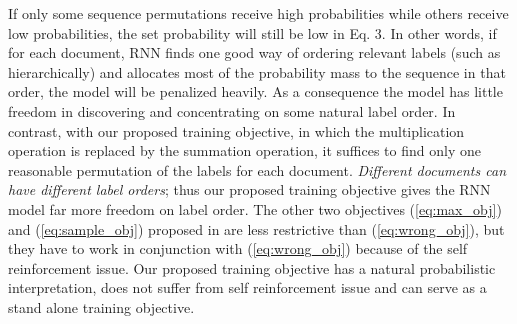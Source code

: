 If only some sequence permutations receive high probabilities while others receive low probabilities, the set probability will still be low in Eq. 3. In other words, if for each document, RNN finds one  good way of ordering relevant labels (such as hierarchically) and allocates most of the probability mass to the sequence in that order, the model will be penalized heavily.  As a consequence the model has little freedom in discovering and concentrating on some natural label order. In contrast, with our proposed training objective, in which the multiplication operation is replaced by the  summation operation, it suffices to find only one reasonable permutation of the labels for each document. \emph{Different documents can have different label orders}; thus our proposed training objective gives the RNN model far more freedom on label order. The other two objectives (\ref{eq:max_obj}) and (\ref{eq:sample_obj}) proposed in \cite{vinyals2015order} are less restrictive than  (\ref{eq:wrong_obj}), but they have to work in conjunction with (\ref{eq:wrong_obj}) because of the self reinforcement issue. Our proposed training objective has a natural probabilistic interpretation, does not suffer from self reinforcement issue and can serve as a stand alone training objective. 


